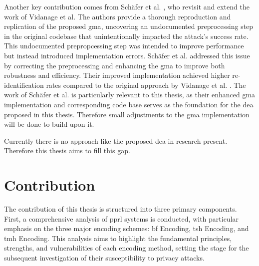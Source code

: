 Another key contribution comes from Schäfer et al. \cite{schaefer2024}, who revisit and extend the work of Vidanage et al. \cite{vidanage2020graph}
The authors provide a thorough reproduction and replication of the proposed \ac{gma}, uncovering an undocumented preprocessing step in the original codebase that unintentionally impacted the attack's success rate.
This undocumented prepropcessing step was intended to improve performance but instead introduced implementation errors.
Schäfer et al. addressed this issue by correcting the preprocessing and enhancing the \ac{gma} to improve both robustness and efficiency.
Their improved implementation achieved higher re-identification rates compared to the original approach by Vidanage et al. \cite{schaefer2024}.
The work of Schäfer et al. is particularly relevant to this thesis, as their enhanced \ac{gma} implementation and corresponding code base serves as the foundation for the \ac{dea} proposed in this thesis.
Therefore small adjustments to the \ac{gma} implementation will be done to build upon it.

Currently there is no approach like the proposed \ac{dea} in research present. Therefore this thesis aims to fill this gap.








\section{Contribution}  \label{sec:contribution}

The contribution of this thesis is structured into three primary components. 
First, a comprehensive analysis of \ac{pprl} systems is conducted, with particular emphasis on the three major encoding schemes: \ac{bf} Encoding, \ac{tsh} Encoding, and \ac{tmh} Encoding. 
This analysis aims to highlight the fundamental principles, strengths, and vulnerabilities of each encoding method, setting the stage for the subsequent investigation of their susceptibility to privacy attacks.

